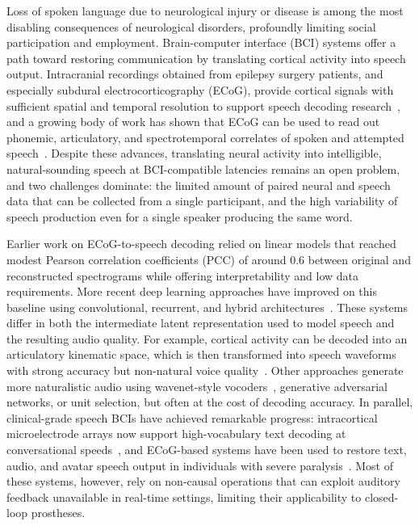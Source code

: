 \documentclass[10pt]{article}
\begin{document}
Loss of spoken language due to neurological injury or disease is among the most disabling consequences of neurological disorders, profoundly limiting social participation and employment. Brain-computer interface (BCI) systems offer a path toward restoring communication by translating cortical activity into speech output. Intracranial recordings obtained from epilepsy surgery patients, and especially subdural electrocorticography (ECoG), provide cortical signals with sufficient spatial and temporal resolution to support speech decoding research~\cite{ritaccio2016ecog}, and a growing body of work has shown that ECoG can be used to read out phonemic, articulatory, and spectrotemporal correlates of spoken and attempted speech~\cite{pasley2012reconstructing,bouchard2014control,mugler2014direct,herff2015brain,flinker2015redefining,wang2021dynamics}. Despite these advances, translating neural activity into intelligible, natural-sounding speech at BCI-compatible latencies remains an open problem, and two challenges dominate: the limited amount of paired neural and speech data that can be collected from a single participant, and the high variability of speech production even for a single speaker producing the same word.

Earlier work on ECoG-to-speech decoding relied on linear models that reached modest Pearson correlation coefficients (PCC) of around $0.6$ between original and reconstructed spectrograms while offering interpretability and low data requirements. More recent deep learning approaches have improved on this baseline using convolutional, recurrent, and hybrid architectures~\cite{akbari2019towards,anumanchipalli2019speech,makin2020machine}. These systems differ in both the intermediate latent representation used to model speech and the resulting audio quality. For example, cortical activity can be decoded into an articulatory kinematic space, which is then transformed into speech waveforms with strong accuracy but non-natural voice quality~\cite{anumanchipalli2019speech}. Other approaches generate more naturalistic audio using wavenet-style vocoders~\cite{akbari2019towards}, generative adversarial networks, or unit selection, but often at the cost of decoding accuracy. In parallel, clinical-grade speech BCIs have achieved remarkable progress: intracortical microelectrode arrays now support high-vocabulary text decoding at conversational speeds~\cite{willett2023highperformance}, and ECoG-based systems have been used to restore text, audio, and avatar speech output in individuals with severe paralysis~\cite{moses2021neuroprosthesis,metzger2023highperformance,silva2024bilingual}. Most of these systems, however, rely on non-causal operations that can exploit auditory feedback unavailable in real-time settings, limiting their applicability to closed-loop prostheses.
\end{document}
